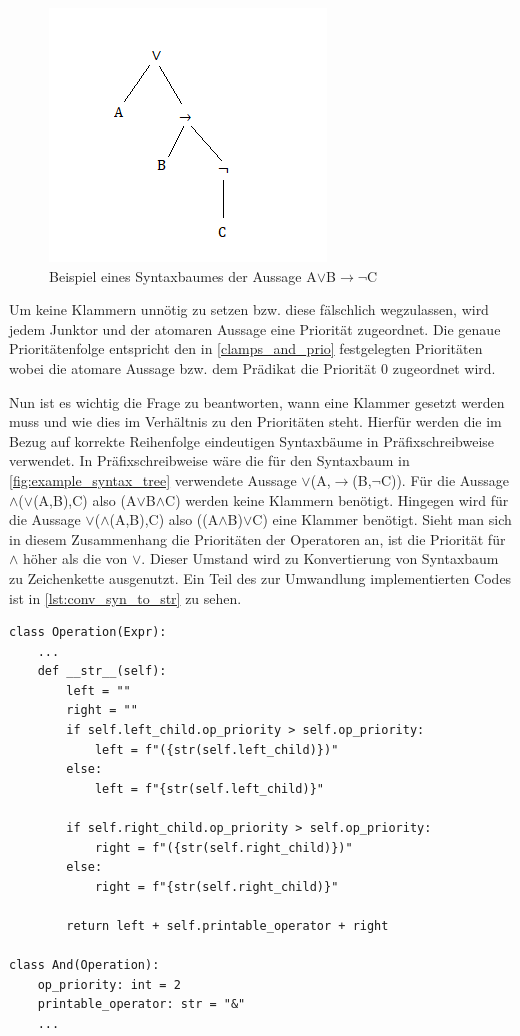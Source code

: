 \begin{figure}[h]
\begin{center}
\includegraphics[scale=1]{images/example_syntax_tree.png}
\caption{Beispiel eines Syntaxbaumes der Aussage A$\vee$B$\rightarrow\neg$C}
\label{fig:example_syntax_tree}
\end{center}
\end{figure}

Um keine Klammern unnötig zu setzen bzw. diese fälschlich wegzulassen, wird jedem Junktor und der atomaren Aussage eine Priorität zugeordnet. Die genaue Prioritätenfolge entspricht den in \autoref{clamps_and_prio} festgelegten Prioritäten wobei die atomare Aussage bzw. dem Prädikat die Priorität 0 zugeordnet wird.

Nun ist es wichtig die Frage zu beantworten, wann eine Klammer gesetzt werden muss und wie dies im Verhältnis zu den Prioritäten steht. Hierfür werden die im Bezug auf korrekte Reihenfolge eindeutigen Syntaxbäume in Präfixschreibweise verwendet. In Präfixschreibweise wäre die für den Syntaxbaum in \autoref{fig:example_syntax_tree} verwendete Aussage $\vee$(A,$\rightarrow$(B,$\neg$C)). Für die Aussage $\wedge$($\vee$(A,B),C) also (A$\vee$B$\wedge$C) werden keine Klammern benötigt. Hingegen wird für die Aussage  $\vee$($\wedge$(A,B),C) also ((A$\wedge$B)$\vee$C) eine Klammer benötigt. Sieht man sich in diesem Zusammenhang die Prioritäten der Operatoren an, ist die Priorität für $\wedge$ höher als die von $\vee$. Dieser Umstand wird zu Konvertierung von Syntaxbaum zu Zeichenkette ausgenutzt. Ein Teil des zur Umwandlung implementierten Codes ist in \autoref{lst:conv_syn_to_str} zu sehen.

\begin{lstlisting}[caption={Umwandlung von Syntaxbaum zu Zeichenkette},label=lst:conv_syn_to_str]
class Operation(Expr):
	...
	def __str__(self):
		left = ""
		right = ""
		if self.left_child.op_priority > self.op_priority:
			left = f"({str(self.left_child)})"
		else:
			left = f"{str(self.left_child)}"
      	
      	if self.right_child.op_priority > self.op_priority:
			right = f"({str(self.right_child)})"
		else:
			right = f"{str(self.right_child)}"
		
		return left + self.printable_operator + right

class And(Operation):
	op_priority: int = 2
	printable_operator: str = "&"
	...
\end{lstlisting}

